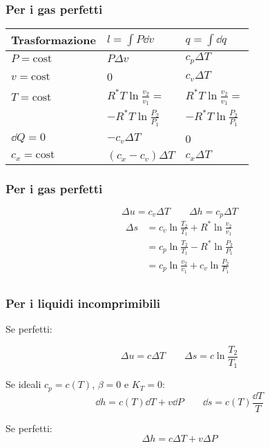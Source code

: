 \subsubsection{Per i gas perfetti}
\begin{tabular}{lll}
    \toprule
    Trasformazione & $l=\int P\dd{v}$ & $q = \int \dd{q}$ \\
    \midrule
    $P = \text{cost}$ & $P\Delta v$ & $c_p\Delta T$ \\
    $v = \text{cost}$ & 0 & $c_v\Delta T$ \\
    $T = \text{cost}$ & $R^*T\ln{\frac{v_2}{v_1}} =$ & $R^*T\ln{\frac{v_2}{v_1}} =$ \\
    & $-R^*T\ln{\frac{P_2}{P_1}}$ & $-R^*T\ln{\frac{P_2}{P_1}}$ \\
    $\dd{Q}=0$ & $-c_v\Delta T$ & 0 \\
    $c_x = \text{cost}$ & $(c_x-c_v)\Delta T$ & $c_x\Delta T$ \\
    \bottomrule
\end{tabular}

\subsubsection{Per i gas perfetti}
\[ \Delta u = c_v \Delta T \qquad \Delta h = c_p \Delta T \]
\begin{align*}
    \Delta s &= c_v \ln{\frac{T_2}{T_1}} + R^*\ln{\frac{v_2}{v_1}} \\
    &= c_p \ln{\frac{T_2}{T_1}} - R^*\ln{\frac{P_2}{P_1}} \\
    &= c_p \ln{\frac{v_2}{v_1}} + c_v\ln{\frac{P_2}{P_1}} \\
\end{align*}

\subsubsection{Per i liquidi incomprimibili}

Se perfetti:

\[ \Delta u = c \Delta T \qquad \Delta s = c \ln{\frac{T_2}{T_1}} \]

Se ideali $c_p = c(T)$, $\beta = 0$ e $K_T = 0$:
\[ \dd{h} = c(T)\dd{T} + v\dd{P} \qquad \dd{s} = c(T)\frac{\dd{T}}{T} \]

Se perfetti:
\[ \Delta h = c\Delta T + v \Delta P \]
